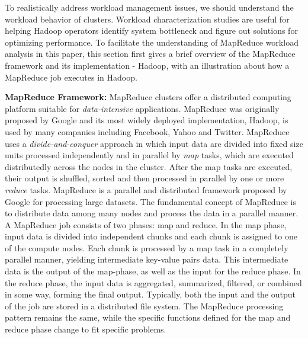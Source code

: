\documentclass[conference]{IEEEtran}
\begin{document}
To realistically address workload management issues, we should understand the workload behavior of clusters.
Workload characterization studies are useful for helping Hadoop operators identify system bottleneck and figure out solutions for optimizing performance.
To facilitate the understanding of MapReduce workload analysis in this paper, this section first gives a brief overview of the MapReduce framework and its implementation - Hadoop, with an illustration about how a MapReduce job executes in Hadoop.


\noindent
\textbf{MapReduce Framework:}
MapReduce clusters offer a distributed computing platform suitable for \textit{data-intensive} applications. 
MapReduce was originally proposed by Google and its most widely deployed implementation, Hadoop, is used by many companies including Facebook, Yahoo and Twitter.
MapReduce uses a \textit{divide-and-conquer} approach in which input data are divided into fixed size units processed independently and in parallel by \textit{map} tasks, which are executed distributedly across the nodes in the cluster. After the map tasks are executed, their output is shuffled, sorted and then processed in parallel by one or more \textit{reduce} tasks.
MapReduce is a parallel and distributed framework proposed by Google for processing large datasets. 
The fundamental concept of MapReduce is to distribute data among many nodes and process the data in a parallel manner. 
A MapReduce job consists of two phases: map and reduce. 
In the map phase, input data is divided into independent chunks and each chunk is assigned to one of the compute nodes. 
Each chunk is processed by a map task in a completely parallel manner, yielding intermediate key-value pairs data. 
This intermediate data is the output of the map-phase, as well as the input for the reduce phase. In the reduce phase, the input data is aggregated, summarized, filtered, or combined in some way, forming the final output. 
Typically, both the input and the output of the job are stored in a distributed file system. 
The MapReduce processing pattern remains the same, while the specific functions defined for the map and reduce phase change to fit specific problems.
\end{document}
